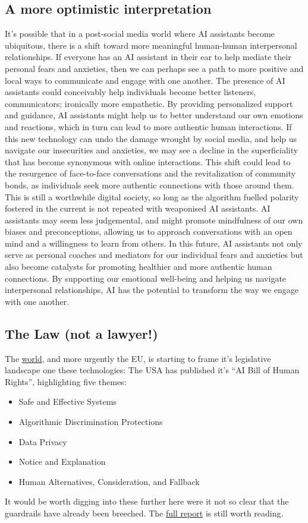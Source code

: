 \subsection{A more optimistic interpretation}
It's possible that in a post-social media world where AI assistants become ubiquitous, there is a shift toward more meaningful human-human interpersonal relationships. If everyone has an AI assistant in their ear to help mediate their personal fears and anxieties, then we can perhaps see a path to more positive and local ways to communicate and engage with one another. The presence of AI assistants could conceivably help individuals become better listeners, communicators; ironically more empathetic. By providing personalized support and guidance, AI assistants might help us to better understand our own emotions and reactions, which in turn can lead to more authentic human interactions. If this new technology can undo the damage wrought by social media, and help us navigate our insecurities and anxieties, we may see a decline in the superficiality that has become synonymous with online interactions. This shift could lead to the resurgence of face-to-face conversations and the revitalization of community bonds, as individuals seek more authentic connections with those around them. This is still a worthwhile digital society, so long as the algorithm fuelled polarity fostered in the current is not repeated with weaponised AI assistants. AI assistants may seem less judgemental, and might promote mindfulness of our own biases and preconceptions, allowing us to approach conversations with an open mind and a willingness to learn from others. In this future, AI assistants not only serve as personal coaches and mediators for our individual fears and anxieties but also become catalysts for promoting healthier and more authentic human connections. By supporting our emotional well-being and helping us navigate interpersonal relationships, AI has the potential to transform the way we engage with one another. 
\newpage
\subsection{The Law (not a lawyer!)}
The \href{https://www.holisticai.com/papers/the-state-of-ai-regulations-in-2023}{world}, and more urgently the EU, is starting to frame it's legislative landscape one these technologies:
The USA has published it's ``AI Bill of Human Rights'', highlighting five themes:
\begin{itemize}
\item Safe and Effective Systems
\item Algorithmic Discrimination Protections
\item Data Privacy
\item Notice and Explanation
\item Human Alternatives, Consideration, and Fallback
\end{itemize}
It would be worth digging into these further here were it not so clear that the guardrails have already been breeched. The \href{https://www.whitehouse.gov/wp-content/uploads/2022/10/Blueprint-for-an-AI-Bill-of-Rights.pdf}{full report} is still worth reading.\par

